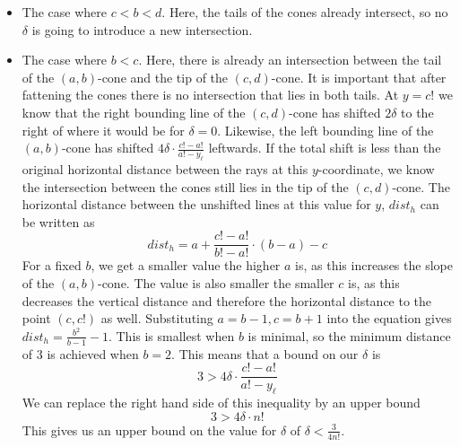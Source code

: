 \documentclass[]{llncs}
\begin{document}
\begin{itemize}
\item The case where \(c < b < d\). Here, the tails of the cones already intersect, so no \(\delta\) is going to introduce a new intersection.

\item The case where \(b < c\). Here, there is already an intersection between the tail of the \((a,b)\)-cone and the tip of the \((c,d)\)-cone. It is important that after fattening the cones there is no intersection that lies in both tails. At $y=c!$ we know that the right bounding line of the \((c,d)\)-cone has shifted \(2\delta\) to the right of where it would be for \(\delta = 0\). Likewise, the left bounding line of the \((a,b)\)-cone has shifted $4\delta \cdot \frac{c!-a!}{a! - y_\ell}$ leftwards. If the total shift is less than the original horizontal distance between the rays at this $y$-coordinate, we know the intersection between the cones still lies in the tip of the $(c,d)$-cone. The horizontal distance between the unshifted lines at this value for $y$, $dist_h$ can be written as \[dist_h = a + \frac{c!-a!}{b!-a!}\cdot(b-a) - c\]
For a fixed $b$, we get a smaller value the higher $a$ is, as this increases the slope of the $(a,b)$-cone. The value is also smaller the smaller $c$ is, as this decreases the vertical distance and therefore the horizontal distance to the point $(c,c!)$ as well. Substituting $a = b-1, c= b+1$ into the equation gives $dist_h = \frac{b^2}{b-1} -1$.
This is smallest when $b$ is minimal, so the minimum distance of $3$ is achieved when $b = 2$. This means that a bound on our \(\delta\) is \[3 > 4\delta \cdot \frac{c!-a!}{a! - y_\ell}\] We can replace the right hand side of this inequality by an upper bound \[3 > 4\delta \cdot n!\] This gives us an upper bound on the value for \(\delta\) of \(\delta < \frac{3}{4n!}\).

\end{itemize}
\end{document}
